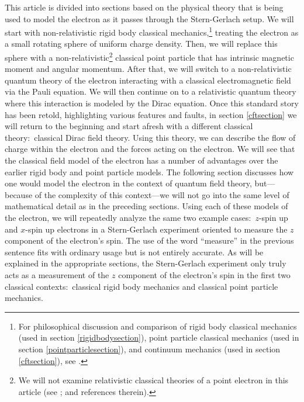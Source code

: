 \documentclass[12pt,secnumarabic,amsmath,amssymb,balancelastpage,nofootinbib]{article}
\begin{document}
This article is divided into sections based on the physical theory that is being used to model the electron as it passes through the Stern-Gerlach setup.  We will start with non-relativistic rigid body classical mechanics,\footnote{For philosophical discussion and comparison of rigid body classical mechanics (used in section \ref{rigidbodysection}), point particle classical mechanics (used in section \ref{pointparticlesection}), and continuum mechanics (used in section \ref{cftsection}), see \citet{wilson1998, wilson2013}.} treating the electron as a small rotating sphere of uniform charge density.  Then, we will replace this sphere with a non-relativistic\footnote{We will not examine relativistic classical theories of a point electron in this article (see \citealp{wen2016}; \citealp{barandes2019long, barandes2019short} and references therein).} classical point particle that has intrinsic magnetic moment and angular momentum.  After that, we will switch to a non-relativistic quantum theory of the electron interacting with a classical electromagnetic field via the Pauli equation.  We will then continue on to a relativistic quantum theory where this interaction is modeled by the Dirac equation.  Once this standard story has been retold, highlighting various features and faults, in section \ref{cftsection} we will return to the beginning and start afresh with a different classical theory:\ classical Dirac field theory.  Using this theory, we can describe the flow of charge within the electron and the forces acting on the electron.  We will see that the classical field model of the electron has a number of advantages over the earlier rigid body and point particle models.  The following section discusses how one would model the electron in the context of quantum field theory, but---because of the complexity of this context---we will not go into the same level of mathematical detail as in the preceding sections.  Using each of these models of the electron, we will repeatedly analyze the same two example cases:\ $z$-spin up and $x$-spin up electrons in a Stern-Gerlach experiment oriented to measure the $z$ component of the electron's spin.  The use of the word ``measure'' in the previous sentence fits with ordinary usage but is not entirely accurate.  As will be explained in the appropriate sections, the Stern-Gerlach experiment only truly acts as a measurement of the $z$ component of the electron's spin in the first two classical contexts:\ classical rigid body mechanics and classical point particle mechanics.
\end{document}
